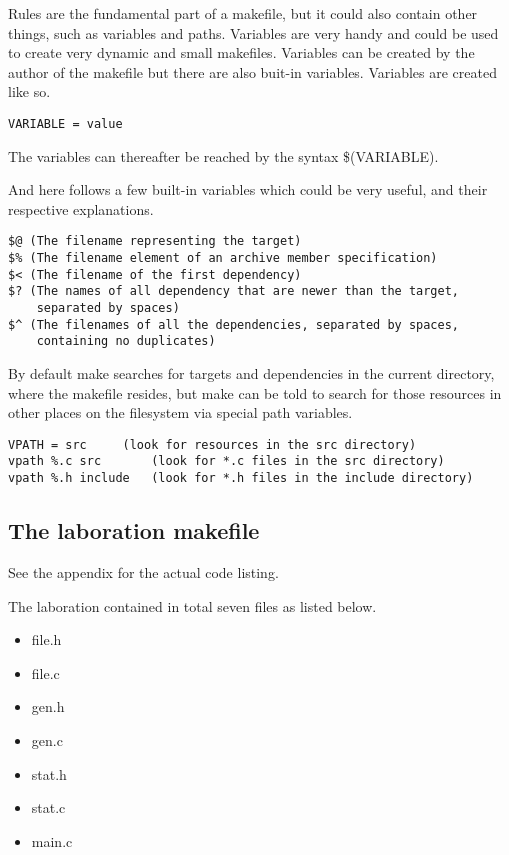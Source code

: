 \documentclass[a4paper,10pt]{article}
\begin{document}
Rules are the fundamental part of a makefile, but it could also contain other things, such as variables and paths. Variables are very handy and could be used to create very dynamic and small makefiles. Variables can be created by the author of the makefile but there are also buit-in variables. Variables are created like so.

\begin{verbatim}
VARIABLE = value
\end{verbatim}

The variables can thereafter be reached by the syntax \$(VARIABLE).

And here follows a few built-in variables which could be very useful, and their respective explanations.

\begin{verbatim}
$@ (The filename representing the target)
$% (The filename element of an archive member specification)
$< (The filename of the first dependency)
$? (The names of all dependency that are newer than the target, 
    separated by spaces)
$^ (The filenames of all the dependencies, separated by spaces, 
    containing no duplicates)
\end{verbatim}

By default make searches for targets and dependencies in the current directory, where the makefile resides, but make can be told to search for those resources in other places on the filesystem via special path variables.

\begin{verbatim}
VPATH = src		(look for resources in the src directory)
vpath %.c src 		(look for *.c files in the src directory)
vpath %.h include 	(look for *.h files in the include directory)
\end{verbatim}

\subsection{The laboration makefile}
See the appendix for the actual code listing.

The laboration contained in total seven files as listed below.

\begin{itemize}
\item file.h
\item file.c
\item gen.h
\item gen.c
\item stat.h
\item stat.c
\item main.c
\end{itemize}
\end{document}
